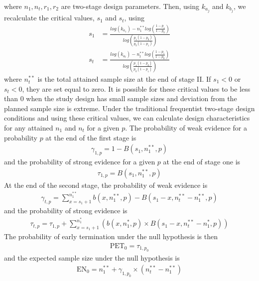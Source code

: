 \documentclass[12pt]{report}\usepackage[]{graphicx}\usepackage[]{color}
\newlength{\li}\setlength{\li}{14.48pt}
\newlength{\di}\setlength{\di}{-3.5mm}
\begin{document}
where $n_1, n_t, r_1, r_2$ are two-stage design parameters. Then, using $k_{a_j}$ and $k_{b_j}$, we recalculate the critical values, $s_1$ and $s_t$, using
\begin{equation}
\begin{aligned}
s_1 &= \frac{log(k_{a_1}) - n_1^{\ast\ast} log\left(\frac{1-p_1}{1-p_0}\right)}{log\left(\frac{p_1(1-p_0)}{p_0(1-p_1)}\right)} \\
s_t &= \frac{log(k_{a_t}) - n_t^{\ast\ast} log\left(\frac{1-p_1}{1-p_0}\right)}{log\left(\frac{p_1(1-p_0)}{p_0(1-p_1)}\right)}
\end{aligned}
\end{equation}
where $n_t^{\ast\ast}$ is the total attained sample size at the end of stage II. If $s_1 < 0$ or $s_t < 0$, they are set equal to zero. It is possible for these critical values to be less than 0 when the study design has small sample sizes and deviation from the planned sample size is extreme. Under the traditional frequentist two-stage design conditions and using these critical values, we can calculate design characteristics for any attained $n_1$ and $n_t$ for a given $p$. The probability of weak evidence for a probability $p$ at the end of the first stage is 
\begin{equation}
\begin{aligned}
\gamma_{1,p} = 1 - B(s_1, n_1^{\ast\ast}, p)
\end{aligned}
\end{equation}
and the probability of strong evidence for a given $p$ at the end of stage one is 
\begin{equation}
\begin{aligned}
\tau_{1,p} = B(s_1, n_1^{\ast\ast}, p)
\end{aligned}
\end{equation}
At the end of the second stage, the probability of weak evidence is 
\begin{equation}
\begin{aligned}
\gamma_{t,p} = \sum_{x=s_1+1}^{n_1^{\ast\ast}} b(x, n_1^{\ast\ast}, p) - B(s_1 - x, n_t^{\ast\ast} - n_1^{\ast\ast}, p)
\end{aligned}
\end{equation}
and the probability of strong evidence is 
\begin{equation}
\begin{aligned}
\tau_{t,p} = \tau_{1,p} + \sum_{x=s_1+1}^{n_1^\ast} \left( b(x,n_1^\ast,p) \times B(s_1 - x, n_t^{\ast\ast}-n_1^\ast, p) \right)
\end{aligned}
\end{equation}
The probability of early termination under the null hypothesis is then 
\begin{equation}
\begin{aligned}
\mbox{PET}_0 = \tau_{1,p_0}
\end{aligned}
\end{equation}
and the expected sample size under the null hypothesis is 
\begin{equation}
\begin{aligned}
\mbox{EN}_0 = n_1^{\ast\ast} + \gamma_{1,p_0} \times (n_t^{\ast\ast} - n_1^{\ast\ast})
\end{aligned}
\end{equation}
\end{document}
